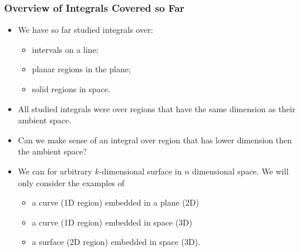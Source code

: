 \begin{frame}
\frametitle{Overview of Integrals Covered so Far}
\begin{itemize}
\item We have so far studied integrals over:
\begin{itemize}
\item intervals on a line;
\item planar regions in the plane;
\item solid regions in space.
\end{itemize}
\item<2-> All studied integrals were over regions that have the same dimension as their ambient space.
\item<3-> Can we make sense of an integral over region that has lower dimension then the ambient space?
\item<4-> We can for arbitrary $k$-dimensional surface in $n$ dimensional space. We will only consider the examples of
\begin{itemize}
\item a curve (1D region) embedded in a plane (2D)
\item a curve (1D region) embedded in space (3D)
\item a surface (2D region) embedded in space (3D).
\end{itemize}
\end{itemize}
\end{frame}